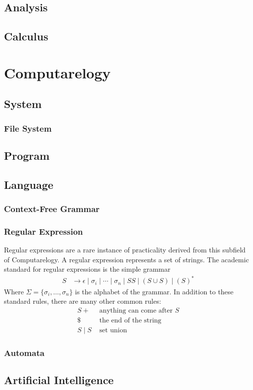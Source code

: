 \documentclass{article}
\begin{document}
\subsection{Analysis}

\subsection{Calculus}

\section{Computarelogy}

\subsection{System}

\subsubsection{File System}
\subsubsection{}

\subsection{Program}

\subsection{Language}
\subsubsection{Context-Free Grammar}
\subsubsection{Regular Expression}

	Regular expressions are a rare instance of practicality derived from this subfield of Computarelogy. A regular expression represents a set of strings. The academic standard for regular expressions is the simple grammar
	\begin{align*}
		S &\rightarrow
			\epsilon
			\mid \sigma_i \mid \cdots \mid \sigma_n
			\mid SS
			\mid (S \cup S)
			\mid (S)^*
	\end{align*}
	Where $\Sigma = \{ \sigma_i, \dots, \sigma_n \}$ is the alphabet of the grammar. In addition to these standard rules, there are many other common rules:
	\[ \begin{array}{c|l}
		S+ &\text{ anything can come after } S\\
		\$ &\text{ the end of the string}\\
		S \mid S &\text{ set union}
	\end{array} \]

\subsubsection{Automata}

\subsection{Artificial Intelligence}
\end{document}
